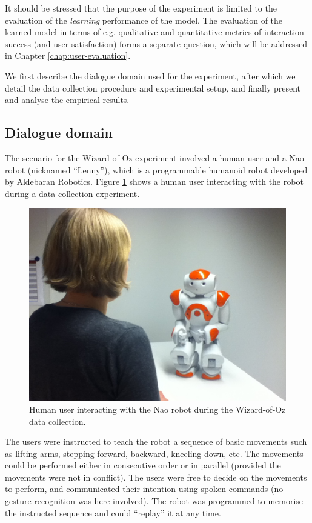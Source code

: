 It should be stressed that the purpose of the experiment is limited to the evaluation of the \textit{learning} performance of the model. The evaluation of the learned model in terms of e.g. qualitative and quantitative metrics of interaction success (and user satisfaction) forms a separate question, which will be addressed in Chapter \ref{chap:user-evaluation}. 

We first describe the dialogue domain used for the experiment, after which we detail the data collection procedure and experimental setup, and finally present and analyse the empirical results. 

\subsection{Dialogue domain}
\label{sec:wozlearning-experiments-domain}

The scenario for the Wizard-of-Oz experiment involved a human user and a Nao robot (nicknamed ``Lenny''), which is a programmable humanoid robot developed by Aldebaran Robotics. Figure \ref{fig:nao} shows a human user interacting with the robot during a data collection experiment. 

\begin{figure}[h]
\begin{center}
\includegraphics[scale=0.25]{imgs/bilde.jpg}
\end{center}
\caption{Human user interacting with the Nao robot during the Wizard-of-Oz data collection.}
\label{fig:nao}
\end{figure}

The users were instructed to teach the robot a sequence of basic movements such as lifting arms, stepping forward, backward, kneeling down, etc.  The movements could be performed either in consecutive order or in parallel (provided the movements were not in conflict).  The users were free to decide on the movements to perform, and communicated their intention using spoken commands (no gesture recognition was here involved).  The robot was programmed to memorise the instructed sequence and could ``replay'' it at any time.

